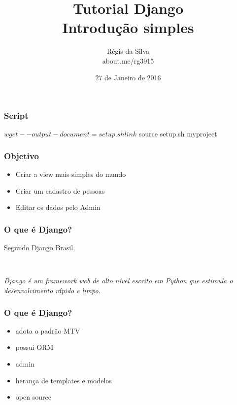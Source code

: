 \documentclass{beamer}
\title{Tutorial Django\\ Introdução simples}
\author{R\'egis da Silva\\ {\texorpdfstring{\color{blue}}{ }about.me/rg3915}}
\institute{\url{github.com/grupy-sp/encontros}}
\date{27 de Janeiro de 2016}
\begin{document}
\justifying %

{%




\begin{frame}
	\titlepage
\end{frame}

\begin{frame}[fragile]\frametitle{Script}

\begin{bashcode}
$ wget --output-document=setup.sh link
$ source setup.sh myproject
\end{bashcode}

\end{frame}


\begin{frame}\frametitle{Objetivo}
	\begin{itemize}
        \item Criar a view mais simples do mundo
        \item Criar um cadastro de pessoas
        \item Editar os dados pelo Admin
	\end{itemize}
\end{frame}

\begin{frame}\frametitle{O que \'e Django?}

Segundo Django Brasil,

\

\begin{exampleblock}{}
    {\it Django \'e um framework web de alto n\'ivel escrito em Python que estimula o desenvolvimento r\'apido e limpo.}
\end{exampleblock}

\end{frame}

\begin{frame}\frametitle{O que \'e Django?}

\begin{itemize}[<+(1)->]
    \item adota o padr\~ao MTV
    \item possui ORM
    \item admin
    \item heran\c ca de templates e modelos
    \item open source
\end{itemize}


\end{frame}}
\end{document}

